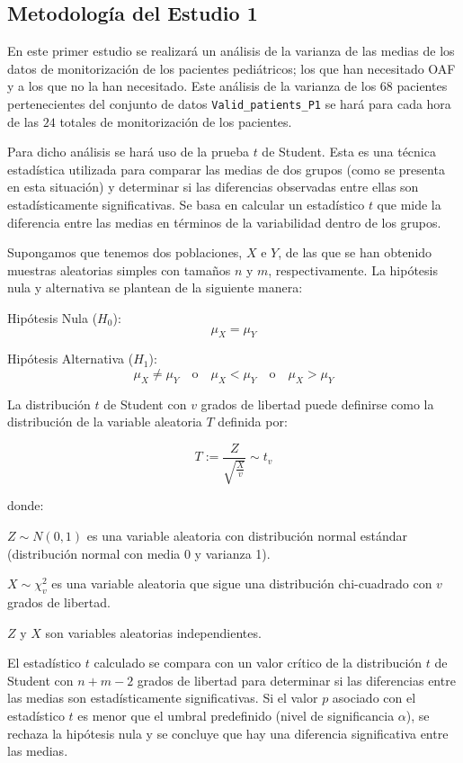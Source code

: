 \subsection{Metodología del Estudio 1}\label{sec:metodologia-estudio-1}

En este primer estudio se realizará un análisis de la varianza de las medias de los datos de monitorización de los pacientes pediátricos; los que han necesitado OAF y a los que no la han necesitado. Este análisis de la varianza de los $68$ pacientes pertenecientes del conjunto de datos \texttt{Valid\_patients\_P1} se hará para cada hora de las $24$ totales de monitorización de los pacientes.

Para dicho análisis se hará uso de la prueba $t$ de Student. Esta es una técnica estadística utilizada para comparar las medias de dos grupos (como se presenta en esta situación) y determinar si las diferencias observadas entre ellas son estadísticamente significativas. Se basa en calcular un estadístico $t$ que mide la diferencia entre las medias en términos de la variabilidad dentro de los grupos.

Supongamos que tenemos dos poblaciones, $X$ e $Y$, de las que se han obtenido muestras aleatorias simples con tamaños $n$ y $m$, respectivamente. La hipótesis nula y alternativa se plantean de la siguiente manera:

Hipótesis Nula ($H_0$):
\[
\mu_X = \mu_Y
\]

Hipótesis Alternativa ($H_1$):
\[
\mu_X \neq \mu_Y \quad \text{o} \quad \mu_X < \mu_Y \quad \text{o} \quad \mu_X > \mu_Y
\]

La distribución \( t \) de Student con \( v \) grados de libertad puede definirse como la distribución de la variable aleatoria \( T \) definida por:

\[ T := \frac{Z}{\sqrt{\frac{X}{v}}} \sim t_v \]

donde:

\( Z \sim N(0,1) \) es una variable aleatoria con distribución normal estándar (distribución normal con media 0 y varianza 1).

\( X \sim \chi_{v}^{2} \) es una variable aleatoria que sigue una distribución chi-cuadrado con \( v \) grados de libertad.

\( Z \) y \( X \) son variables aleatorias independientes.

El estadístico \( t \) calculado se compara con un valor crítico de la distribución \( t \) de Student con \( n+m-2 \) grados de libertad para determinar si las diferencias entre las medias son estadísticamente significativas. Si el valor \( p \) asociado con el estadístico \( t \) es menor que el umbral predefinido (nivel de significancia \( \alpha \)), se rechaza la hipótesis nula y se concluye que hay una diferencia significativa entre las medias.


